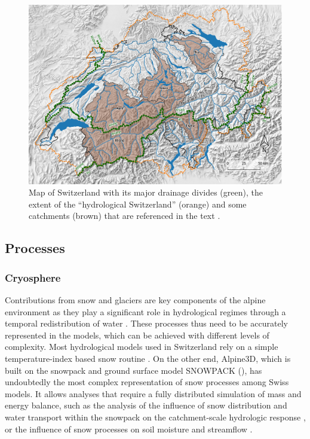 \documentclass[10pt,a4paper]{article}
\begin{document}
\begin{figure}[htb]
	\begin{center}
		\includegraphics[width=0.95\columnwidth]{figures/map}
		\caption{{Map of Switzerland with its major drainage divides (green), the extent of the ``hydrological Switzerland'' (orange) and some catchments (brown) that are referenced in the text \citep[Federal Office of Topography swisstopo;][]{hades2018}. \label{fig:map}
		}}
	\end{center}
\end{figure}


\subsection{Processes}
\label{sec:context:processes}


\subsubsection{Cryosphere}
\label{sec:context:cryosphere}

Contributions from snow and glaciers are key components of the alpine environment as they play a significant role in hydrological regimes through a temporal redistribution of water \citep{Barnett2005}. These processes thus need to be accurately represented in the models, which can be achieved with different levels of complexity. Most hydrological models used in Switzerland rely on a simple temperature-index based snow routine \citep[see for example][]{Jenicek2018}. On the other end, Alpine3D, which is built on the snowpack and ground surface model SNOWPACK (\citealt{Bartelt2002, Lehning2002a, Lehning2002b}), has undoubtedly the most complex representation of snow processes among Swiss models. It allows analyses that require a fully distributed simulation of mass and energy balance, such as the analysis of the influence of snow distribution and water transport within the snowpack on the catchment-scale hydrologic response \citep{Brauchli2017}, or the influence of snow processes on soil moisture and streamflow \citep{Wever2017}.
\end{document}
